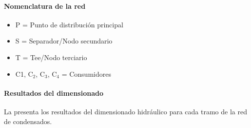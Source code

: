 \documentclass[12pt]{article}
\begin{document}
\paragraph{Nomenclatura de la red}

\begin{itemize}[noitemsep]
	\item P = Punto de distribución principal
	\item S = Separador/Nodo secundario
	\item T = Tee/Nodo terciario
	\item C1, C$_2$, C$_3$, C$_4$ = Consumidores
\end{itemize}

\paragraph{Resultados del dimensionado}

La  presenta los resultados del dimensionado hidráulico para cada tramo de la red de condensados.
\end{document}
